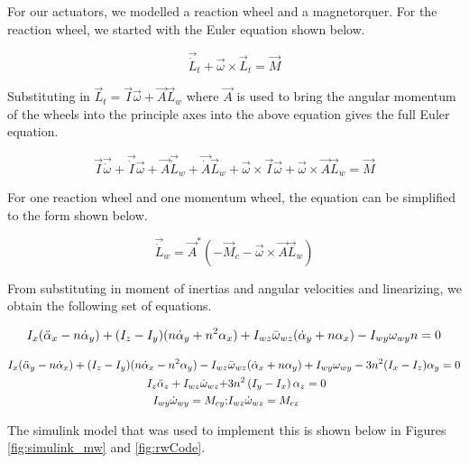 For our actuators, we modelled a reaction wheel and a magnetorquer. For the reaction wheel, we started with the Euler equation shown below.

\begin{equation}
    \Vec{\dot L}_t + \Vec{\omega} \times \Vec{L}_t = \Vec{M}
\end{equation}

Substituting in $\Vec{L}_t = \Vec{I} \Vec{\omega} + \Vec{A} \Vec{L}_w$ where $\Vec{A}$ is used to bring the angular momentum of the wheels into the principle axes into the above equation gives the full Euler equation.

\begin{equation}
    \Vec{I} \Vec{\dot \omega} + \Vec{\dot I} \Vec{\omega} + \Vec{A} \Vec{\dot L}_w + \Vec{\dot A} \Vec{L}_w + \Vec{\omega} \times \Vec{I} \Vec{\omega} + \Vec{\omega} \times \Vec{A} \Vec{L}_w = \Vec{M}
\end{equation}

For one reaction wheel and one momentum wheel, the equation can be simplified to the form shown below.

\begin{equation}
    \Vec{\dot L}_w = \Vec{A}^* \left( - \Vec{M}_c - \Vec{\omega} \times \Vec{A} \Vec{L}_w \right)
\end{equation}

From substituting in moment of inertias and angular velocities and linearizing, we obtain the following set of equations.

\begin{align}
    I_x (\Ddot{\alpha}_x - n \dot \alpha_y ) + (I_z - I_y) ( n \dot \alpha_y + n^2 \alpha_x ) + I_{wz}\Bar{\omega}_{wz} ( \dot \alpha_y + n \alpha_x) - I_{wy} \omega_{wy} n = 0
\end{align}

\begin{align*}
    I_x (\Ddot{\alpha}_y - n \dot \alpha_x ) + (I_z - I_y) ( n \dot \alpha_x - n^2 \alpha_y ) - I_{wz}&\Bar{\omega}_{wz} ( \dot \alpha_x + n \alpha_y) + I_{wy} \omega_{wy} - 3 n^2 (I_x - I_z) \alpha_y = 0 \\
    I_z \Ddot{\alpha}_z + I_{wz} \dot \omega_{wz} +& 3n^2\left( I_y - I_x \right) \alpha_z = 0 \\
    I_{wy} \dot \omega_{wy} = M_{cy} ;& I_{wz} \dot \omega_{wz} = M_{cz}
\end{align*}


The simulink model that was used to implement this is shown below in Figures \ref{fig:simulink_mw} and \ref{fig:rwCode}.

